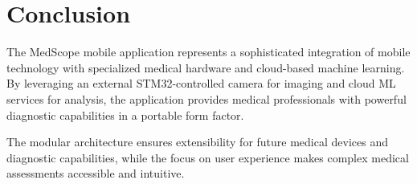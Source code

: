\section{Conclusion}

The MedScope mobile application represents a sophisticated integration of mobile technology with specialized medical hardware and cloud-based machine learning. By leveraging an external STM32-controlled camera for imaging and cloud ML services for analysis, the application provides medical professionals with powerful diagnostic capabilities in a portable form factor.

The modular architecture ensures extensibility for future medical devices and diagnostic capabilities, while the focus on user experience makes complex medical assessments accessible and intuitive.